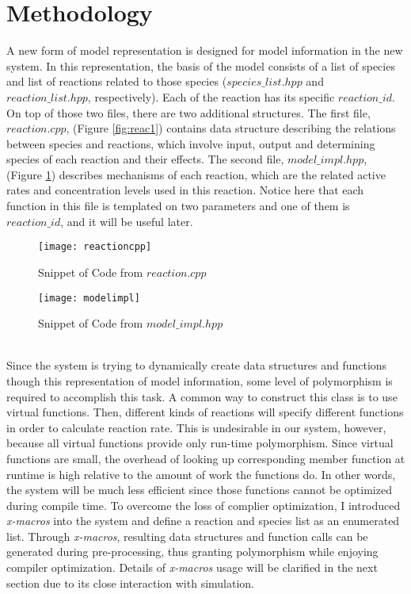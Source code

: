 \documentclass[../thesis.tex]{subfiles}
\begin{document}
\section{Methodology}
A new form of model representation is designed for model information in the new system. In this representation, the basis of the model consists of a list of species and list of reactions related to those species ($species\_list.hpp$ and $reaction\_list.hpp$, respectively). Each of the reaction has its specific $reaction\_id$. On top of those two files, there are two additional structures.  The first file, $reaction.cpp$, (Figure \ref{fig:reac1}) contains data structure describing the relations between species and reactions, which involve input, output and determining species of each reaction and their effects. The second file, $model\_impl.hpp$, (Figure \ref{fig:modelim1}) describes mechanisms of each reaction, which are the related active rates and concentration levels used in this reaction. Notice here that each function in this file is templated on two parameters and one of them is $reaction\_id$, and it will be useful later.\\
\begin{figure}[h]
\centering
\texttt{[image: reactioncpp]}
\caption{Snippet of Code from $reaction.cpp$}
\label{fig:reac1}
\texttt{[image: modelimpl]}
\caption{Snippet of Code from $model\_impl.hpp$}
\label{fig:modelim1}
\end{figure}
\\
Since the system is trying to dynamically create data structures and functions though this representation of model information, some level of polymorphism is required to accomplish this task. A common way to construct this class is to use virtual functions. Then, different kinds of reactions will specify different functions in order to calculate reaction rate. This is undesirable in our system, however, because all virtual functions provide only run-time polymorphism.  Since virtual functions are small, the overhead of looking up corresponding member function at runtime is high relative to the amount of work the functions do. In other words, the system will be much less efficient since those functions cannot be optimized during compile time. To overcome the loss of complier optimization, I introduced \textit{x-macros} into the system and define a reaction and species list as an enumerated list. Through \textit{x-macros}, resulting data structures and function calls can be generated during pre-processing, thus granting polymorphism while enjoying compiler optimization. Details of \textit{x-macros} usage will be clarified in the next section due to its close interaction with simulation. 
\end{document}

